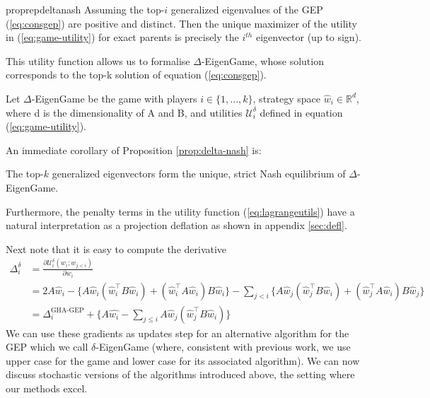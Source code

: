 \begin{restatable}{proprep}{deltanash}
    \label{prop:delta-nash}
    Assuming the top-$i$ generalized eigenvalues of the GEP (\ref{eq:consgep}) are positive and distinct. Then the unique maximizer of the utility in (\ref{eq:game-utility}) for exact parents is precisely the $i^{th}$ eigenvector (up to sign).
\end{restatable}

This utility function allows us to formalise $\Delta$-EigenGame, whose solution corresponds to the top-k solution of equation (\ref{eq:consgep}).

\begin{definition}
    Let $\Delta$-EigenGame be the game with players $i \in \{1,...,k\}$, strategy space $\hat{w}_{i} \in \mathbb{R}^d$, where d is the dimensionality of A and B, and utilities $\mathcal{U}_{i}^{\delta}$ defined in equation (\ref{eq:game-utility}).
\end{definition}

An immediate corollary of Proposition \ref{prop:delta-nash} is:
\begin{corollary}
    The top-$k$ generalized eigenvectors form the unique, strict Nash equilibrium of $\Delta$-EigenGame.
\end{corollary}

Furthermore, the penalty terms in the utility function (\ref{eq:lagrangeutils}) have a natural interpretation as a projection deflation as shown in appendix \ref{sec:defl}.

Next note that it is easy to compute the derivative
\begin{align}
    \label{eq:utility-update}
    \Delta_{i}^\delta
    &=
    \frac{\partial \mathcal{U}_{i}^{\delta}(w_i ; w_{j<i})}{\partial w_i} \\
    &=
    2 A\hat{w}_{i}
    - \{ A\hat{w}_{i}(\hat{w}_{i}^{\top}B\hat{w}_{i}) + (\hat{w}_{i}^{\top}A\hat{w}_{i})B \hat{w}_{i}\}
    - \sum_{j< i} \{A\hat{w}_{j}(\hat{w}_{j}^{\top}B\hat{w}_{i}) + (\hat{w}_{j}^{\top}A\hat{w}_{i})B \hat{w}_{j}\}\nonumber\\
    &=
    \Delta_i^\text{GHA-GEP} + \{ A\hat{w_i} - \sum_{j\leq i} A\hat{w}_{j}(\hat{w}_{j}^{\top}B\hat{w}_{i})\} \nonumber
\end{align}
We can use these gradients as updates step for an alternative algorithm for the GEP which we call $\delta$-EigenGame (where, consistent with previous work, we use upper case for the game and lower case for its associated algorithm). We can now discuss stochastic versions of the algorithms introduced above, the setting where our methods excel.

